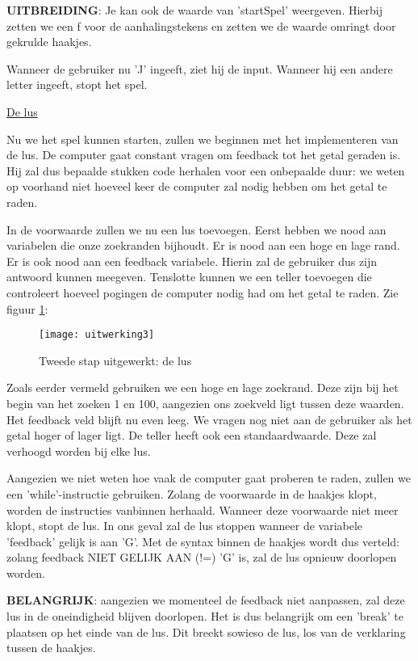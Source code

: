 \textbf{UITBREIDING}: Je kan ook de waarde van 'startSpel' weergeven. Hierbij zetten we een f voor de aanhalingstekens en zetten we de waarde omringt door gekrulde haakjes. 

Wanneer de gebruiker nu 'J' ingeeft, ziet hij de input. Wanneer hij een andere letter ingeeft, stopt het spel.

\underline{De lus}

Nu we het spel kunnen starten, zullen we beginnen met het implementeren van de lus. De computer gaat constant vragen om feedback tot het getal geraden is. Hij zal dus bepaalde stukken code herhalen voor een onbepaalde duur: we weten op voorhand niet hoeveel keer de computer zal nodig hebben om het getal te raden.  

In de voorwaarde zullen we nu een lus toevoegen. Eerst hebben we nood aan variabelen die onze zoekranden bijhoudt. Er is nood aan een hoge en lage rand. 
Er is ook nood aan een feedback variabele. Hierin zal de gebruiker dus zijn antwoord kunnen meegeven.
Tenslotte kunnen we een teller toevoegen die controleert hoeveel pogingen de computer nodig had om het getal te raden. Zie figuur \ref{fig:uitwerking3}:

\begin{figure}
    \texttt{[image: uitwerking3]}
    \caption{Tweede stap uitgewerkt: de lus}
    \label{fig:uitwerking3}
\end{figure}

Zoals eerder vermeld gebruiken we een hoge en lage zoekrand. Deze zijn bij het begin van het zoeken 1 en 100, aangezien ons zoekveld ligt tussen deze waarden.
Het feedback veld blijft nu even leeg. We vragen nog niet aan de gebruiker als het getal hoger of lager ligt.
De teller heeft ook een standaardwaarde. Deze zal verhoogd worden bij elke lus.

Aangezien we niet weten hoe vaak de computer gaat proberen te raden, zullen we een 'while'-instructie gebruiken. Zolang de voorwaarde in de haakjes klopt, worden de instructies vanbinnen herhaald. 
Wanneer deze voorwaarde niet meer klopt, stopt de lus.
In ons geval zal de lus stoppen wanneer de variabele 'feedback' gelijk is aan 'G'. 
Met de syntax binnen de haakjes wordt dus verteld: 
zolang feedback NIET GELIJK AAN (!=) 'G' is, zal de lus opnieuw doorlopen worden.

\textbf{BELANGRIJK}: aangezien we momenteel de feedback niet aanpassen, zal deze lus in de oneindigheid blijven doorlopen. Het is dus belangrijk om een 'break' te plaatsen op het einde van de lus. Dit breekt sowieso de lus, los van de verklaring tussen de haakjes.

